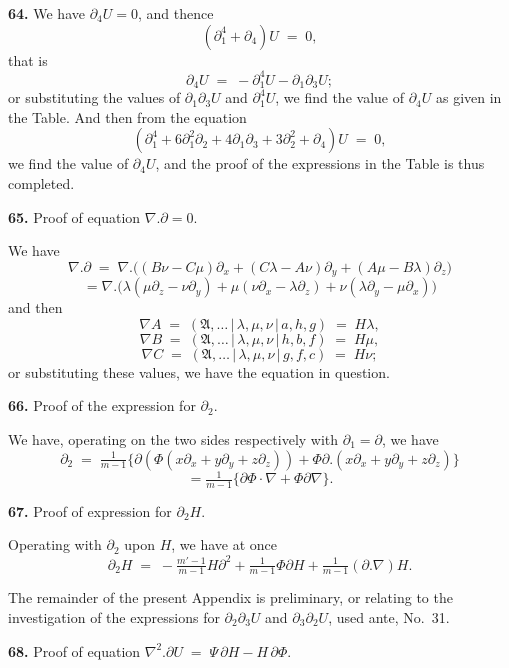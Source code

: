 \documentclass[11pt,a4paper]{article}
\providecommand{\mid}{\,|\,}
\begin{document}
\textbf{64.} We have $\partial_4 U = 0$, and thence
\[
(\partial_1^4 + \partial_4)U \;=\; 0,
\]
that is
\[
\partial_4 U \;=\; -\partial_1^4 U - \partial_1\partial_3 U;
\]
or substituting the values of $\partial_1\partial_3 U$ and $\partial_1^4 U$, we find the value of $\partial_4 U$ as given in the Table. And then from the equation
\[
(\partial_1^4 + 6\partial_1^2\partial_2 + 4\partial_1\partial_3 + 3\partial_2^2 + \partial_4)U \;=\; 0,
\]
we find the value of $\partial_4 U$, and the proof of the expressions in the Table is thus completed.

\medskip

\textbf{65.} Proof of equation $\nabla.\partial = 0$.

We have
\[
\nabla.\partial \;=\; \nabla.\bigl((B\nu - C\mu)\partial_x + (C\lambda - A\nu)\partial_y + (A\mu - B\lambda)\partial_z\bigr)
\]
\[
= \nabla.\bigl(\lambda(\mu\partial_z - \nu\partial_y) + \mu(\nu\partial_x - \lambda\partial_z) + \nu(\lambda\partial_y - \mu\partial_x)\bigr)
\]
and then
\[
\nabla A \;=\; (\mathfrak{A},\ldots\mid \lambda,\mu,\nu\mid a,h,g) \;=\; H\lambda,
\]
\[
\nabla B \;=\; (\mathfrak{A},\ldots\mid \lambda,\mu,\nu\mid h,b,f) \;=\; H\mu,
\]
\[
\nabla C \;=\; (\mathfrak{A},\ldots\mid \lambda,\mu,\nu\mid g,f,c) \;=\; H\nu;
\]
or substituting these values, we have the equation in question.

\medskip

\textbf{66.} Proof of the expression for $\partial_2$.

We have, operating on the two sides respectively with $\partial_1 = \partial$, we have
\[
\partial_2 \;=\; \tfrac{1}{m-1}\bigl\{\partial(\Phi(x\partial_x + y\partial_y + z\partial_z)) + \Phi\partial.(x\partial_x + y\partial_y + z\partial_z)\bigr\}
\]
\[
= \tfrac{1}{m-1}\bigl\{\partial\Phi\cdot\nabla + \Phi\partial\nabla\bigr\}.
\]

\medskip

\textbf{67.} Proof of expression for $\partial_2 H$.

Operating with $\partial_2$ upon $H$, we have at once
\[
\partial_2 H \;=\; -\tfrac{m'-1}{m-1}H\partial^2 + \tfrac{1}{m-1}\Phi\partial H + \tfrac{1}{m-1}(\partial.\nabla)H.
\]

\medskip

The remainder of the present Appendix is preliminary, or relating to the investigation of the expressions for $\partial_2\partial_3 U$ and $\partial_3\partial_2 U$, used ante, No.~31.

\medskip

\textbf{68.} Proof of equation $\nabla^2.\partial U \;=\; \Psi\,\partial H - H\,\partial\Phi.$
\end{document}
